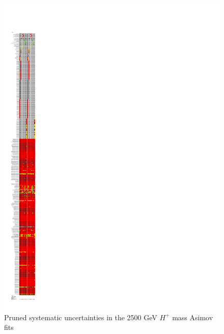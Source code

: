 \begin{figure}[H]
  \centering
  \includegraphics[keepaspectratio, scale=0.85]{images/Pruning/Pruning_Asimov_Hp2500_Contained80_DL1r_70.pdf}
  \caption{Pruned systematic uncertainties in the 2500 GeV $H^{+}$ mass Asimov fits}
  \label{fig:Pruning_Asimov_Hp2500_Contained80_DL1r_70}
\end{figure}

